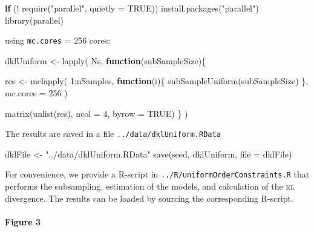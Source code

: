 \documentclass[
]{article}
\newenvironment{Shaded}{\begin{snugshade}}{\end{snugshade}}
\newcommand{\AttributeTok}[1]{\textcolor[rgb]{0.77,0.63,0.00}{#1}}
\newcommand{\ConstantTok}[1]{\textcolor[rgb]{0.00,0.00,0.00}{#1}}
\newcommand{\ControlFlowTok}[1]{\textcolor[rgb]{0.13,0.29,0.53}{\textbf{#1}}}
\newcommand{\DecValTok}[1]{\textcolor[rgb]{0.00,0.00,0.81}{#1}}
\newcommand{\FunctionTok}[1]{\textcolor[rgb]{0.00,0.00,0.00}{#1}}
\newcommand{\NormalTok}[1]{#1}
\newcommand{\OtherTok}[1]{\textcolor[rgb]{0.56,0.35,0.01}{#1}}
\newcommand{\SpecialCharTok}[1]{\textcolor[rgb]{0.00,0.00,0.00}{#1}}
\newcommand{\StringTok}[1]{\textcolor[rgb]{0.31,0.60,0.02}{#1}}
\begin{document}
\begin{Shaded}
\begin{Highlighting}[]
\ControlFlowTok{if}\NormalTok{ (}\SpecialCharTok{!} \FunctionTok{require}\NormalTok{(}\StringTok{"parallel"}\NormalTok{, }\AttributeTok{quietly =} \ConstantTok{TRUE}\NormalTok{))}
  \FunctionTok{install.packages}\NormalTok{(}\StringTok{"parallel"}\NormalTok{)}
\FunctionTok{library}\NormalTok{(parallel)}
\end{Highlighting}
\end{Shaded}

using \texttt{mc.cores} = 256 cores:

\begin{Shaded}
\begin{Highlighting}[]
\NormalTok{dklUniform }\OtherTok{\textless{}{-}} \FunctionTok{lapply}\NormalTok{(}
\NormalTok{  Ns,}
  \ControlFlowTok{function}\NormalTok{(subSampleSize)\{}
    
\NormalTok{    res }\OtherTok{\textless{}{-}} \FunctionTok{mclapply}\NormalTok{(}
      \DecValTok{1}\SpecialCharTok{:}\NormalTok{nSamples,}
      \ControlFlowTok{function}\NormalTok{(i)\{}
        \FunctionTok{subSampleUniform}\NormalTok{(subSampleSize)}
\NormalTok{      \},}
      \AttributeTok{mc.cores =} \DecValTok{256}
\NormalTok{    )}
    
    \FunctionTok{matrix}\NormalTok{(}\FunctionTok{unlist}\NormalTok{(res), }\AttributeTok{ncol =} \DecValTok{4}\NormalTok{, }\AttributeTok{byrow =} \ConstantTok{TRUE}\NormalTok{)}
\NormalTok{  \}}
\NormalTok{)}
\end{Highlighting}
\end{Shaded}

The results are saved in a file \texttt{../data/dklUniform.RData}

\begin{Shaded}
\begin{Highlighting}[]
\NormalTok{dklFile }\OtherTok{\textless{}{-}} \StringTok{"../data/dklUniform.RData"}
\FunctionTok{save}\NormalTok{(seed, dklUniform, }\AttributeTok{file =}\NormalTok{ dklFile)}
\end{Highlighting}
\end{Shaded}

For convenience, we provide a R-script in
\texttt{../R/uniformOrderConstraints.R} that performs the subsampling,
estimation of the models, and calculation of the \textsc{kl} divergence.
The results can be loaded by sourcing the corresponding R-script.

\hypertarget{figure-3}{%
\paragraph{Figure 3}\label{figure-3}}
\end{document}
